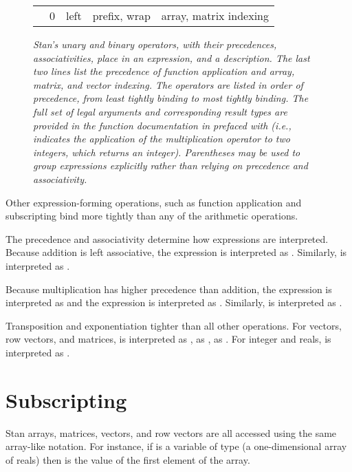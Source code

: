 \begin{figure}
\begin{center}
\begin{tabular}{c|ccl|l}
\code{[]} & 0 & left & prefix, wrap & array, matrix indexing
\end{tabular}
\end{center}
\caption{\it Stan's unary and binary operators, with their
  precedences, associativities, place in an expression, and a
  description.  The last two lines list the precedence of function
  application and array, matrix, and vector indexing. The operators are
  listed in order of precedence, from least tightly binding to most
  tightly binding.  The full set of legal arguments and corresponding
  result types are provided in the function documentation in
   prefaced with  (i.e.,
   indicates the application of the
  multiplication operator to two integers, which returns an integer).
  Parentheses may be used to group expressions explicitly rather than
  relying on precedence and
  associativity.}\label{operator-precedence.figure}
\end{figure}
%
Other expression-forming operations, such as function application and
subscripting bind more tightly than any of the arithmetic operations.  

The precedence and associativity determine how expressions are
interpreted.  Because addition is left associative, the expression
 is interpreted as .  Similarly,
 is interpreted as .  

Because multiplication has higher precedence than addition, the
expression  is interpreted as  and the
expression  is interpreted as .  Similarly,
 is interpreted as .

Transposition and exponentiation tighter than all other operations.
For vectors, row vectors, and matrices, 
 is interpreted as ,  as
,  as .
For integer and reals,
is interpreted as .



\section{Subscripting}

Stan arrays, matrices, vectors, and row vectors are all accessed
using the same array-like notation.  For instance, if  is a
variable of type  (a one-dimensional array of reals)
then  is the value of the first element of the
array.  

